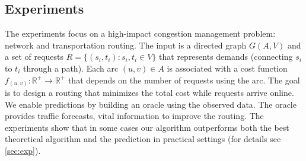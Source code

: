 %
%

\subsection{Experiments}
The experiments focus on a high-impact congestion management problem: network and transportation routing. The input is a directed graph $G(A,V)$ and a set of requests $R = \{(s_{i}, t_{i}) : s_{i}, t_{i} \in V\}$ that represents demands (connecting $s_{i}$ to $t_{i}$ through a path). Each arc $(u, v) \in A$ is associated with a cost function $f_{(u,v)}: \mathbb{R}^{+} \rightarrow \mathbb{R}^{+}$ that depends on the number of requests using the arc. The goal is to design a routing that minimizes the total cost while requests arrive online. We enable predictions by building an oracle using the observed data. The oracle provides traffic forecasts, vital information to improve the routing. The experiments show that in some cases our algorithm outperforms both the best theoretical algorithm and the prediction in practical settings (for details see \cref{sec:exp}).


